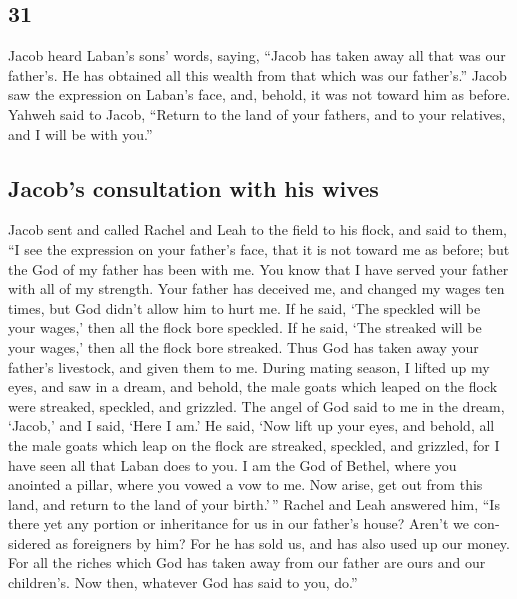 \begin{paracol}{2}
\begin{otherlanguage}{english}
{\section{31}\label{section-61}}

 Jacob heard Laban's sons' words, saying, ``Jacob has
taken away all that was our father's. He has obtained all this wealth
from that which was our father's.''  Jacob saw the
expression on Laban's face, and, behold, it was not toward him as
before.  Yahweh said to Jacob, ``Return to the land of
your fathers, and to your relatives, and I will be with you.''

\hypertarget{jacobs-consultation-with-his-wives}{%
\subsection{Jacob's consultation with his
wives}\label{jacobs-consultation-with-his-wives}}

 Jacob sent and called Rachel and Leah to the field to his
flock,  and said to them, ``I see the expression on your
father's face, that it is not toward me as before; but the God of my
father has been with me.  You know that I have served your
father with all of my strength.  Your father has deceived
me, and changed my wages ten times, but God didn't allow him to hurt me.
 If he said, `The speckled will be your wages,' then all
the flock bore speckled. If he said, `The streaked will be your wages,'
then all the flock bore streaked.  Thus God has taken away
your father's livestock, and given them to me.  During
mating season, I lifted up my eyes, and saw in a dream, and behold, the
male goats which leaped on the flock were streaked, speckled, and
grizzled.  The angel of God said to me in the dream,
`Jacob,' and I said, `Here I am.'  He said, `Now lift up
your eyes, and behold, all the male goats which leap on the flock are
streaked, speckled, and grizzled, for I have seen all that Laban does to
you.  I am the God of Bethel, where you anointed a
pillar, where you vowed a vow to me. Now arise, get out from this land,
and return to the land of your birth.'\,''  Rachel and
Leah answered him, ``Is there yet any portion or inheritance for us in
our father's house?  Aren't we considered as foreigners
by him? For he has sold us, and has also used up our money.
 For all the riches which God has taken away from our
father are ours and our children's. Now then, whatever God has said to
you, do.''


\end{otherlanguage}
\end{paracol}
